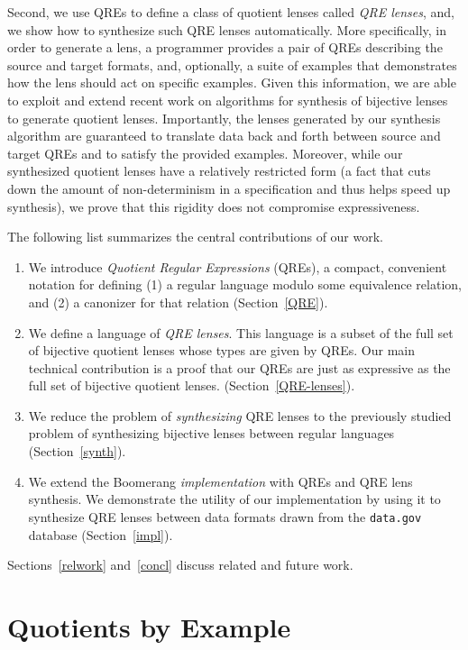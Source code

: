 \documentclass[acmsmall,review,anonymous]{acmart}\settopmatter{printfolios=true,printccs=false,printacmref=false}
\begin{document}
Second, we use QREs to define a class of quotient lenses called {\em QRE
lenses}, and, we show how to synthesize such QRE
lenses automatically.  
More specifically, in
order to generate a lens, a programmer provides a pair of QREs
describing the source and target formats, and, optionally,
a suite of examples that demonstrates how the
lens should act on specific examples.  Given this information,
we are able to exploit and extend recent work on algorithms for synthesis of
bijective lenses~\cite{optician} to generate quotient lenses.
Importantly, the lenses generated by
our synthesis algorithm are guaranteed to translate data back and forth
between source and target QREs and to satisfy the provided examples.
Moreover, while our synthesized quotient lenses have a relatively
restricted form (a fact that cuts down the amount of non-determinism in
a specification and thus helps speed up synthesis), we prove that
this rigidity does not compromise expressiveness.

The following list summarizes the central contributions of our work.
\begin{enumerate}
  \item We introduce {\em Quotient Regular Expressions} (QREs),
  a compact, convenient notation for defining (1) a
  regular language modulo some equivalence relation, and (2) a canonizer
  for that relation (Section~\ref{QRE}).
  \item We define a language of {\em QRE lenses}.  This language is
  a subset of the full set of bijective quotient
  lenses whose types are given by QREs. Our main technical contribution
  is a proof that our QREs are just as expressive as the full set of bijective
  quotient lenses.
  (Section~\ref{QRE-lenses}).
  \item We reduce the problem of {\em synthesizing}
  QRE lenses to the previously studied problem of synthesizing bijective lenses
  between regular languages (Section~\ref{synth}).
  \item We extend the Boomerang {\em implementation} with QREs
  and QRE lens synthesis.  We demonstrate the utility of our
  implementation by using it to
  synthesize QRE lenses between data formats drawn from the
  {\tt data.gov} database (Section~\ref{impl}).
\end{enumerate}
Sections~\ref{relwork} and~\ref{concl} discuss related and future work.

\section{Quotients by Example}
\label{sec:example}
\end{document}
